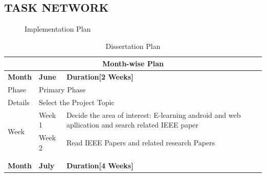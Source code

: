 \documentclass[oneside,a4paper,12pt]{report}
\begin{document}
\subsection{TASK NETWORK}
\begin{center}
	\begin{figure}[!htbp]
		\centering
	  \caption{Implementation Plan}
	  \label{fig:iplan}
	\end{figure}
\end{center}
\begin{table}[h!]
\begin{center}
\newpage
\caption{Dissertation Plan}
\begin{tabular}{|l|l|l|}
\hline
\multicolumn{3}{|c|}{\textbf{Month-wise Plan}}                                                                                                                                        \\ \hline
\textbf{Month}        & \textbf{June}                      & \textbf{Duration{[}2 Weeks{]}}                                                                                           \\ \hline
Phase                 & \multicolumn{2}{|l|}{Primary Phase}                                                                                                                           \\ \hline
Details               & \multicolumn{2}{|l|}{Select the Project Topic}                                                                                                                \\ \hline
\multirow{2}{*}{Week} & \multicolumn{1}{|m{4.0cm}|}{Week 1}                             & \multicolumn{1}{|m{9.0cm}|}{Decide the area of interest: E-learning android and web apllication and search related IEEE paper}
 \\ \cline{2-3} 
                      & \multicolumn{1}{|m{4.0cm}|}{Week 2}                             & Read IEEE Papers and related research  Papers                                                                            \\ \cline{2-3} 
\\ \hline
\multicolumn{3}{|l|}{}                                                                                                                                                                \\ \hline
\textbf{Month}        & \textbf{July}                    & \textbf{Duration{[}4 Weeks{]}}                                                                                           \\ \hline

\end{tabular}
\end{center}
\end{table}
\end{document}

